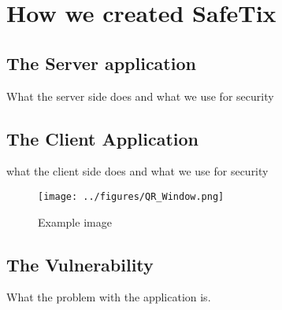 \section{How we created SafeTix}
\subsection{The Server application}
What the server side does and what we use for security
\subsection{The Client Application}
what the client side does and what we use for security
\begin{figure}[h]
    \centering
    \texttt{[image: ../figures/QR\_Window.png]}
    \caption{Example image}
    \label{fig:screenshot}
\end{figure}
\subsection{The Vulnerability}
What the problem with the application is.

